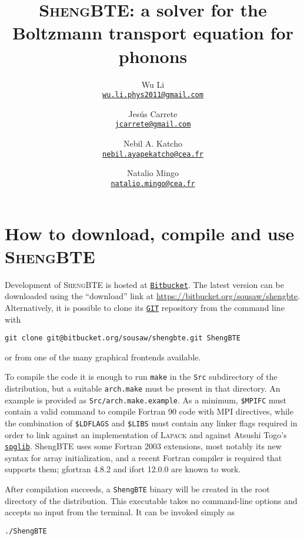 \documentclass[a4paper,10pt,english]{article}
\title{\textsc{ShengBTE}: a solver for the Boltzmann transport equation for phonons}
\author{
  Wu Li\\\href{mailto:wu.li.phys2011@gmail.com}{\nolinkurl{wu.li.phys2011@gmail.com}}
  \and
  Jes\'us Carrete\\\href{mailto:jcarrete@gmail.com}{\nolinkurl{jcarrete@gmail.com}}
  \and
  Nebil A. Katcho\\\href{mailto:nebil.ayapekatcho@cea.fr}{\nolinkurl{nebil.ayapekatcho@cea.fr}}
  \and
  Natalio Mingo\\\href{mailto:natalio.mingo@cea.fr}{\nolinkurl{natalio.mingo@cea.fr}}
}
\date{}
\begin{document}
\maketitle

\tableofcontents
\newpage


\section{How to download, compile and use \textsc{ShengBTE}}

Development of \textsc{ShengBTE} is hosted at \href{http://www.bitbucket.org}{\nolinkurl{Bitbucket}}. The latest version can be downloaded using the ``download'' link at \url{https://bitbucket.org/sousaw/shengbte}. Alternatively, it is possible to clone its \href{http://git-scm.com/}{\nolinkurl{GIT}} repository from the command line with

\begin{verbatim}
git clone git@bitbucket.org/sousaw/shengbte.git ShengBTE
\end{verbatim}

\noindent or from one of the many graphical frontends available.

To compile the code it is enough to run \texttt{make} in the \texttt{Src} subdirectory of the distribution, but a suitable \texttt{arch.make} must be present in that directory. An example is provided as \texttt{Src/arch.make.example}. As a minimum, \texttt{\$MPIFC} must contain a valid command to compile Fortran 90 code with MPI directives, while the combination of \texttt{\$LDFLAGS} and \texttt{\$LIBS} must contain any linker flags required in order to link against an implementation of \textsc{Lapack} and against Atsushi Togo's \href{http://spglib.sourceforge.net/}{\nolinkurl{spglib}}. ShengBTE uses some Fortran 2003 extensions, most notably its new syntax for array initialization, and a recent Fortran compiler is required that supports them; gfortran 4.8.2 and ifort 12.0.0 are known to work.

After compilation succeeds, a \texttt{ShengBTE} binary will be created in the root directory of the distribution. This executable takes no command-line options and accepts no input from the terminal. It can be invoked simply as

\begin{verbatim}
./ShengBTE
\end{verbatim}
\end{document}
